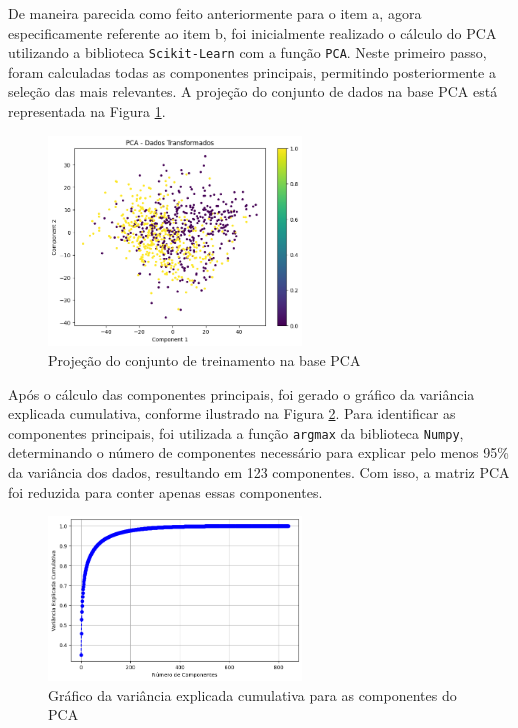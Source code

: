 \documentclass[]{abntex2}
\begin{document}
\newpage

De maneira parecida como feito anteriormente para o item a, agora especificamente referente ao item b, foi inicialmente realizado o cálculo do PCA utilizando a biblioteca \texttt{Scikit-Learn} com a função \texttt{PCA}. Neste primeiro passo, foram calculadas todas as componentes principais, permitindo posteriormente a seleção das mais relevantes. A projeção do conjunto de dados na base PCA está representada na Figura \ref{fig:PCA}.

\begin{figure}
    \centering 
    \includegraphics[width=0.6\textwidth]{imgs/ex1/PCA.png}
    \caption{Projeção do conjunto de treinamento na base PCA}
    \label{fig:PCA} %
\end{figure}

Após o cálculo das componentes principais, foi gerado o gráfico da variância explicada cumulativa, conforme ilustrado na Figura \ref{fig:vari_pca}. Para identificar as componentes principais, foi utilizada a função \texttt{argmax} da biblioteca \texttt{Numpy}, determinando o número de componentes necessário para explicar pelo menos 95\% da variância dos dados, resultando em 123 componentes. Com isso, a matriz PCA foi reduzida para conter apenas essas componentes.

\begin{figure}
    \centering 
    \includegraphics[width=0.6\textwidth]{imgs/ex1/vari_pca.png}
    \caption{Gráfico da variância explicada cumulativa para as componentes do PCA}
    \label{fig:vari_pca} %
\end{figure}
\end{document}
